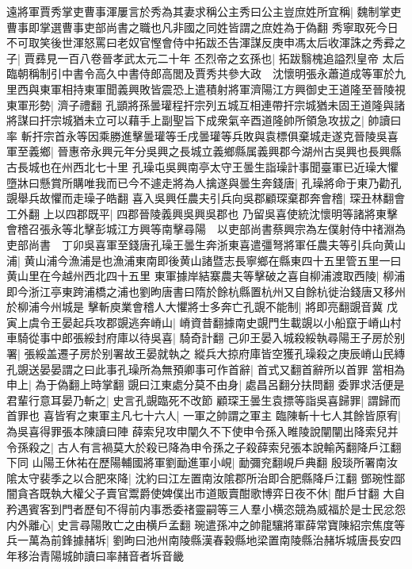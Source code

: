 遠將軍賈秀掌吏曹事渾屢言於秀為其妻求稱公主秀曰公主豈庶姓所宜稱|{
	魏制掌吏曹事即掌選曹事吏部尚書之職也凡非國之同姓皆謂之庶姓為于偽翻}
秀寧取死今日不可取笑後世渾怒罵曰老奴官慳會侍中拓跋丕告渾謀反庚申馮太后收渾誅之秀彛之子|{
	賈彞見一百八卷晉孝武太元二十年}
丕烈帝之玄孫也|{
	拓跋翳槐追謚烈皇帝}
太后臨朝稱制引中書令高久中書侍郎高閭及賈秀共參大政　沈懷明張永蕭道成等軍於九里西與東軍相持東軍聞義興敗皆震恐上遣積射將軍濟陽江方興御史王道隆至晉陵視東軍形勢|{
	濟子禮翻}
孔顗將孫曇瓘程扞宗列五城互相連帶扞宗城猶未固王道隆與諸將謀曰扞宗城猶未立可以藉手上副聖旨下成衆氣辛酉道隆帥所領急攻拔之|{
	帥讀曰率}
斬扞宗首永等因乘勝進擊曇瓘等壬戌曇瓘等兵敗與袁標俱棄城走遂克晉陵吳喜軍至義鄉|{
	晉惠帝永興元年分吳興之長城立義鄉縣属義興郡今湖州古吳興也長興縣古長城也在州西北七十里}
孔璪屯吳興南亭太守王曇生詣璪計事聞臺軍已近璪大懼墮牀曰懸賞所購唯我而已今不遽走將為人擒遂與曇生奔錢唐|{
	孔璪將命于東乃勸孔覬舉兵故懼而走璪子皓翻}
喜入吳興任農夫引兵向吳郡顧琛棄郡奔會稽|{
	琛丑林翻會工外翻}
上以四郡既平|{
	四郡晉陵義興吳興吳郡也}
乃留吳喜使統沈懷明等諸將東擊會稽召張永等北擊彭城江方興等南擊尋陽　以吏部尚書蔡興宗為左僕射侍中禇淵為吏部尚書　丁卯吳喜軍至錢唐孔璪王曇生奔浙東喜遣彊弩將軍任農夫等引兵向黄山浦|{
	黄山浦今漁浦是也漁浦東南即後黄山諸暨志長寧鄉在縣東四十五里管五里一曰黄山里在今越州西北四十五里}
東軍據岸結寨農夫等擊破之喜自柳浦渡取西陵|{
	柳浦即今浙江亭東跨浦橋之浦也劉昫唐書曰隋於餘杭縣置杭州又自餘杭徙治錢唐又移州於柳浦今州城是}
擊斬庾業會稽人大懼將士多奔亡孔覬不能制|{
	將即亮翻覬音冀}
戊寅上虞令王晏起兵攻郡覬逃奔嵴山|{
	嵴資昔翻據南史覬門生載覬以小船竄于嵴山村}
車騎從事中郎張綏封府庫以待吳喜|{
	騎奇計翻}
己卯王晏入城殺綏執尋陽王子房於别署|{
	張綏盖遷子房於别署故王晏就執之}
縱兵大掠府庫皆空獲孔璪殺之庚辰嵴山民縳孔覬送晏晏謂之曰此事孔璪所為無預卿事可作首辭|{
	首式又翻首辭所以首罪}
當相為申上|{
	為于偽翻上時掌翻}
覬曰江東處分莫不由身|{
	處昌呂翻分扶問翻}
委罪求活便是君輩行意耳晏乃斬之|{
	史言孔覬臨死不改節}
顧琛王曇生袁摽等詣吳喜歸罪|{
	謂歸而首罪也}
喜皆宥之東軍主凡七十六人|{
	一軍之帥謂之軍主}
臨陳斬十七人其餘皆原宥|{
	為吳喜得罪張本陳讀曰陣}
薛索兒攻申闡久不下使申令孫入睢陵說闡闡出降索兒并令孫殺之|{
	古人有言禍莫大於殺已降為申令孫之子殺薛索兒張本說輸芮翻降戶江翻下同}
山陽王休祐在歷陽輔國將軍劉勔進軍小峴|{
	勔彌兖翻峴戶典翻}
殷琰所署南汝隂太守裴季之以合肥來降|{
	沈約曰江左置南汝隂郡所治即合肥縣降戶江翻}
鄧琬性鄙闇貪吝既執大權父子賣官鬻爵使婢僕出市道販賣酣歌博弈日夜不休|{
	酣戶甘翻}
大自矜遇賓客到門者歷旬不得前内事悉委禇靈嗣等三人羣小横恣競為威福於是士民忿怨内外離心|{
	史言尋陽敗亡之由横戶孟翻}
琬遣孫冲之帥龍驤將軍薛常寶陳紹宗焦度等兵一萬為前鋒據赭坼|{
	劉昫曰池州南陵縣漢春穀縣地梁置南陵縣治赭坼城唐長安四年移治青陽城帥讀曰率赭音者坼音畿}
